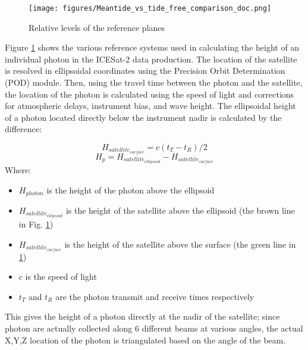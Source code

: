 \begin{figure}[!ht]
      \centering
      \texttt{[image: figures/Meantide\_vs\_tide\_free\_comparison\_doc.png]}
      \caption{Relative levels of the reference planes}
      \label{fig:geoids-ellipsoids-graphics}
\end{figure}

Figure \ref{fig:geoids-ellipsoids-graphics} shows the various reference systems used in calculating the height of an individual photon in the ICESat-2 data production. The location of the satellite is resolved in ellipsoidal coordinates using the Precision Orbit Determination (POD) module. Then, using the travel time between the photon and the satellite, the location of the photon is calculated using the speed of light and corrections for atmospheric delays, instrument bias, and wave height. The ellipsoidal height of a photon located directly below the instrument nadir is calculated by the difference:


\begin{equation}\label{eq:raw_photon_calculation}
      H_{satellite_{surface}} = c(t_T-t_R)/2
\end{equation}
\begin{equation}
      H_p = H_{satellite_{ellipsoid}} - H_{satellite_{surface}}
\end{equation}
Where:
\begin{itemize}
      \item $H_{photon}$ is the height of the photon above the ellipsoid
      \item $H_{satellite_{ellipsoid}}$ is the height of the satellite above the ellipsoid (the brown line in Fig. \ref{fig:geoids-ellipsoids-graphics})
      \item $H_{satellite_{surface}}$ is the height of the satellite above the surface (the green line in \ref{fig:geoids-ellipsoids-graphics})
      \item $c$ is the speed of light
      \item $t_T$ and $t_R$ are the photon transmit and receive times respectively
\end{itemize}

This gives the height of a photon directly at the nadir of the satellite; since photon are actually collected along 6 different beams at various angles, the actual X,Y,Z location of the photon is triangulated based on the angle of the beam. 

